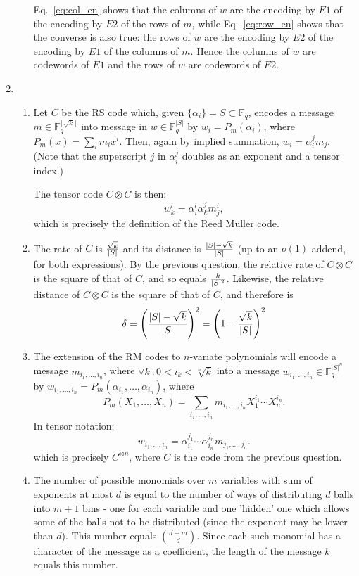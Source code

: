 \documentclass[11pt]{article} \usepackage{amssymb}
\begin{document}
\begin{enumerate}
\begin{enumerate}
Eq.~\ref{eq:col_en} shows that the columns of $w$ are the encoding by $E1$
of the encoding by $E2$ of the rows of $m$, while 
Eq.~\ref{eq:row_en} shows that the converse is also true: the rows of $w$
are the encoding by $E2$ of the encoding by $E1$ of the columns of $m$. 
Hence the columns of $w$ are codewords of $E1$ and the rows of $w$ 
are codewords of $E2$. 
\end{enumerate}
\item
\begin{enumerate}
\item
Let $C$ be the RS code which, given $\{\alpha_i\}=S\subset \mathbb{F}_q$, encodes a message  
$m\in \mathbb{F}_q^{\lfloor\sqrt{k}\rfloor}$ into message in $w\in \mathbb{F}_q^{|S|}$ by $w_{i}=P_m(\alpha_i)$, where 
$P_m(x)=\sum_im_ix^i$. Then, again by implied summation, $w_i=\alpha_i^jm_j$. (Note that
the superscript $j$ in $\alpha_i^j$ doubles as an exponent and a
tensor index.)

The tensor code $C\otimes C$ is then:
\begin{equation*}
  w_k^l=\alpha_i^l\alpha_k^jm_j^i,
\end{equation*}
which is precisely the definition of the Reed Muller code.
\item
The rate of $C$ is ${\sqrt{k}\over |S|}$  and its distance is 
${|S|-\sqrt{k} \over |S|}$ (up to an $o(1)$ addend, for both expressions). By the previous question,
the relative rate of $C\otimes C$ is the square of that of $C$, and so equals
${k\over |S|^2}$. Likewise, the relative distance of $C\otimes C$ is the square
of that of $C$, and therefore is
\begin{equation*}
  \delta=\left({|S|-\sqrt{k} \over |S|}\right)^2
        =\left(1-{\sqrt{k} \over |S|}\right)^2
\end{equation*}
\item
The extension of the RM codes to $n$-variate polynomials will encode
a message $m_{i_1,\ldots,i_n}$, where $\forall k\:: 0<i_k<\sqrt[n]{k}$ into a message
 $w_{i_1,\ldots,i_n}\in \mathbb{F}_q^{|S|^n}$ by $w_{i_1,\ldots,i_n}=P_m(\alpha_{i_1},\ldots,\alpha_{i_n})$, where
 \begin{equation*}
P_m(X_1,\ldots,X_n)=\sum_{i_1,\ldots,i_n}m_{i_1,\ldots,i_n}X_1^{i_1}\cdots X_n^{i_n}.
 \end{equation*}
In tensor notation:
\begin{equation*}
  w_{i_1,\ldots,i_n}=\alpha_{i_1}^{j_1}\cdots\alpha_{i_n}^{j_n}m_{j_1,\ldots,j_n}.  
\end{equation*}
which is precisely $C^{\otimes n}$, where $C$ is the code from the
previous question.
\item
The number of possible monomials over $m$ variables with sum of exponents  at
most $d$ is equal to the number of ways of distributing $d$ balls 
into $m + 1$ bins - one for each variable and one 'hidden' one which 
allows some of the balls not to be distributed (since the exponent may be
lower than $d$). This number equals ${d+m\choose d}$. Since each such monomial has
a character of the message as a coefficient, the length of the message
$k$ equals this number.


\end{enumerate}
\end{enumerate}
\end{document}
